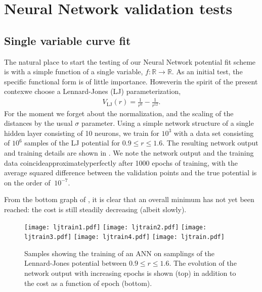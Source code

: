 \documentclass[../../master.tex]{subfiles}
\begin{document}
\chapter{Neural Network validation tests \label{NNvalidation}}
\section{Single variable curve fit}
The natural place to start the testing of our Neural Network potential fit scheme is with a simple function of a single variable, $f:\mathbb{R}\rightarrow\mathbb{R}$. As an initial test, the specific functional form is of little importance. However\textemdash in the spirit of the present contex\textemdash we choose a Lennard-Jones (LJ) parameterization,
\begin{align}
V_\text{LJ}(r) = \frac{1}{r^{6}}-\frac{1}{r^{12}}.
\end{align}
For the moment we forget about the normalization, and the scaling of the distances by the usual $\sigma$ parameter. Using a simple network structure of a single hidden layer consisting of 10 neurons, we train for $10^3$ with a data set consisting of $10^6$ samples of the LJ potential for $0.9\le r\le 1.6$. The resulting network output and training details are shown in . We note the network output and the training data coincide\textemdash approximately\textemdash perfectly after 1000 epochs of training, with the average squared difference between the validation points and the true potential is on the order of $~10^{-7}$. 

From the bottom graph of , it is clear that an overall minimum has not yet been reached: the cost is still steadily decreasing (albeit slowly). 

\begin{figure}
\centering
\texttt{[image: ljtrain1.pdf]}
\texttt{[image: ljtrain2.pdf]}
\texttt{[image: ljtrain3.pdf]}
\texttt{[image: ljtrain4.pdf]}
\texttt{[image: ljtrain.pdf]}
\caption{Samples showing the training of an ANN on samplings of the Lennard-Jones potential between $0.9\le r \le 1.6$. The evolution of the network output with increasing epochs is shown (top) in addition to the cost as a function of epoch (bottom).  \label{fig:ljtrain}}
\end{figure}
\end{document}

